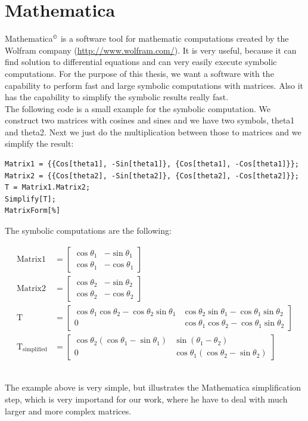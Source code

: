 \section{Mathematica}
Mathematica$^{\textrm{\copyright}}$ is a software tool for mathematic computations created by the Wolfram company (\url{http://www.wolfram.com/}). It is very useful, because it can find solution to differential equations and can very easily execute symbolic computations. For the purpose of this thesis, we want a software with the capability to perform fast and large symbolic computations with matrices. Also it has the capability to simplify the symbolic results really fast. \\
The following code is a small example for the symbolic computation. We construct two matrices with cosines and sines and we have two symbols, theta1 and theta2. Next we just do the multiplication between those to matrices and we simplify the result:

\begin{scriptsize}
\begin{verbatim}
Matrix1 = {{Cos[theta1], -Sin[theta1]}, {Cos[theta1], -Cos[theta1]}};
Matrix2 = {{Cos[theta2], -Sin[theta2]}, {Cos[theta2], -Cos[theta2]}};
T = Matrix1.Matrix2;
Simplify[T];
MatrixForm[%]
\end{verbatim}
\end{scriptsize}
The symbolic computations are the following:
\begin{small}
\begin{align*}
\text{Matrix1} &= \begin{bmatrix}
\cos\theta_1 & -\sin\theta_1\\
\cos\theta_1 & -\cos\theta_1
\end{bmatrix}\\
\text{Matrix2} &= \begin{bmatrix}
\cos\theta_2 & -\sin\theta_2\\
\cos\theta_2 & -\cos\theta_2
\end{bmatrix}\\
\text{T} &= \begin{bmatrix}
\cos\theta_1\cos\theta_2 - \cos\theta_2\sin\theta_1 &   \cos\theta_2 \sin\theta_1 - \cos\theta_1 \sin\theta_2\\
0 & \cos\theta_1 \cos\theta_2 - \cos\theta_1 \sin\theta_2
\end{bmatrix}\\
\text{T}_{\text{simplified}} &= \begin{bmatrix}
\cos\theta_2\left(\cos\theta_1 - \sin\theta_1\right) & \sin\left(\theta_1 - \theta_2\right)\\
 0 & \cos\theta_1 \left(\cos\theta_2 - \sin\theta_2\right)
\end{bmatrix}
\end{align*}\\
\end{small}
The example above is very simple, but illustrates the Mathematica simplification step, which is very importand for our work, where he have to deal with much larger and more complex matrices.